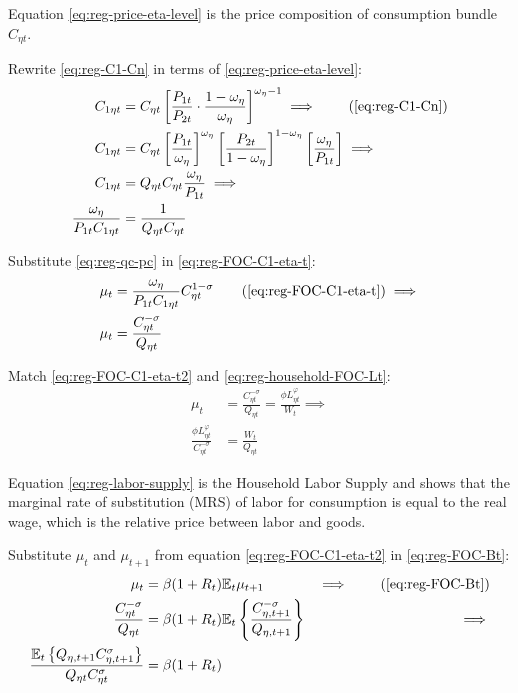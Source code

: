 \documentclass[
thesis.tex
]{subfiles}
\begin{document}
Equation \ref{eq:reg-price-eta-level} is the price composition of consumption bundle $C_{\eta t}$.

Rewrite \ref{eq:reg-C1-Cn} in terms of \ref{eq:reg-price-eta-level}:
	\begin{align}
		C_{1\eta t} &= C_{\eta t} \left[ \frac{P_{1t}}{P_{2t}} \cdot \frac{1 -\omega_{\eta}}{\omega_{\eta}} \right]^{\omega_{\eta} -1} \implies \tag{\ref{eq:reg-C1-Cn}} \\
		C_{1\eta t} &= C_{\eta t} \left[ \frac{ P_{1t} }{ \omega_{\eta} }\right]^{ \omega_{\eta} } \left[ \frac{P_{2t}}{1-\omega_{\eta}} \right]^{1 -\omega_{\eta}} \left[ \frac{\omega_{\eta}}{P_{1t}} \right] \implies \nonumber \\
		C_{1\eta t} &= Q_{\eta t} C_{\eta t} \frac{\omega_{\eta}}{P_{1t}} \implies \nonumber \\
		\frac{\omega_{\eta}}{P_{1t} C_{1\eta t}} &= \frac{1}{Q_{\eta t} C_{\eta t}} \label{eq:reg-qc-pc}
	\end{align}

Substitute \ref{eq:reg-qc-pc} in \ref{eq:reg-FOC-C1-eta-t}:
\begin{align}
	\mu_t &= \frac{\omega_{\eta}}{P_{1t} C_{1\eta t}} C_{\eta t}^{1 -\sigma} \tag{\ref{eq:reg-FOC-C1-eta-t}} \implies \\
	\mu_t &= \frac{ C_{\eta t}^{-\sigma} }{ Q_{\eta t} }  \label{eq:reg-FOC-C1-eta-t2}
\end{align}

Match \ref{eq:reg-FOC-C1-eta-t2} and \ref{eq:reg-household-FOC-Lt}:
\begin{align}
	\mu_t &= \frac{ C_{\eta t}^{-\sigma} }{ Q_{\eta t} } = \frac{\phi L_{\eta t}^{\varphi}}{W_t} \implies \nonumber \\
	\frac{\phi L_{\eta t}^{\varphi}}{C_{\eta t}^{-\sigma}} &= \frac{W_t}{Q_{\eta t}} \label{eq:reg-labor-supply}
\end{align}

Equation \ref{eq:reg-labor-supply} is the Household Labor Supply and shows that the marginal rate of substitution (MRS) of labor for consumption is equal to the real wage, which is the relative price between labor and goods.

Substitute $\mu_t$ and $\mu_{t+1}$ from equation \ref{eq:reg-FOC-C1-eta-t2} in \ref{eq:reg-FOC-Bt}:
\begin{alignat}{2}
	\mu_t &= \beta (1 + R_{t}) \E{ \mu_{t+1} } &\implies \tag{\ref{eq:reg-FOC-Bt}} \\
	\frac{ C_{\eta t}^{-\sigma} }{ Q_{\eta t} } &= \beta (1 + R_{t}) \E \left\{ \frac{ C_{\eta, t+1}^{-\sigma} }{ Q_{\eta, t+1} } \right\} &\implies \nonumber \\
	\frac{ \E \left\{ Q_{\eta, t+1} C_{\eta, t+1}^{\sigma} \right\} }{ Q_{\eta t} C_{\eta t}^{\sigma} } &= \beta (1 + R_{t}) \label{eq:reg-bonds-euler-equation}
\end{alignat}
\end{document}
